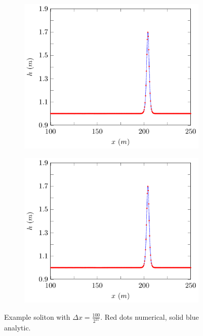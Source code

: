 \begin{figure}
	\begin{subfigure}{0.5\textwidth}
		\includegraphics[width=\textwidth]{./chp5/figures/Analytic/Soliton/Example/D.pdf}
	\end{subfigure}%
	\begin{subfigure}{0.5\textwidth}
		\includegraphics[width=\textwidth]{./chp5/figures/Analytic/Soliton/Example/W.pdf}
	\end{subfigure}
	\caption{Example soliton with $\Delta x = \frac{100}{2^{11}}$. Red dots numerical, solid blue analytic.}
	\label{fig:SolitonExAll}
\end{figure}

